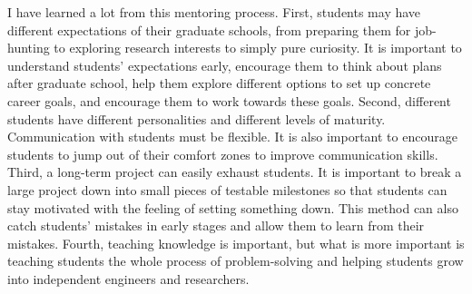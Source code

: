 \documentclass[10pt]{article}
\begin{document}
I have learned a lot from this mentoring process. First, students may have different expectations of their graduate schools, from preparing them for job-hunting to exploring research interests to simply pure curiosity. 
It is important to understand students' expectations early, encourage them to think about plans after graduate school, help them explore different options to set up concrete career goals, and encourage them to work towards these goals.
Second, different students have different personalities and different levels of maturity. Communication with students must be flexible. It is also important to encourage students to jump out of their comfort zones to improve communication skills. 
Third, a long-term project can easily exhaust students. It is important to break a large project
down into small pieces of testable milestones so that students can stay motivated with the feeling of setting something down. 
This method can also catch students' mistakes in early stages and allow them to learn from their mistakes. 
Fourth, teaching knowledge is important, but what is more important is teaching students the whole process of problem-solving and helping students grow into independent engineers and researchers.







%
%
\end{document}
